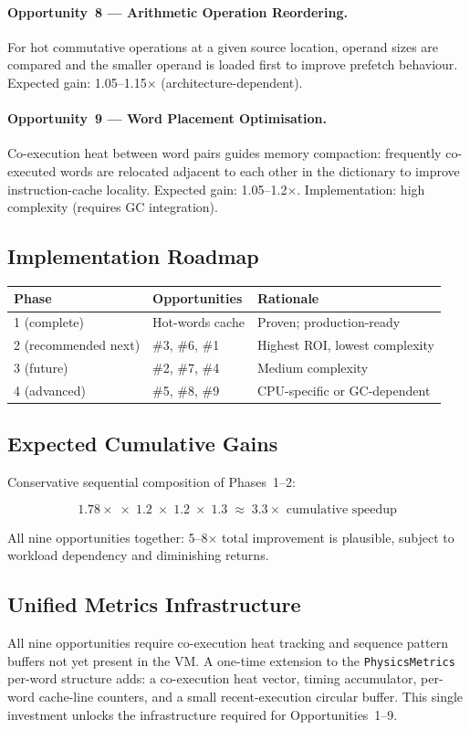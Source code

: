 \paragraph{Opportunity~8 — Arithmetic Operation Reordering.}
For hot commutative operations at a given source location, operand sizes
are compared and the smaller operand is loaded first to improve prefetch
behaviour. Expected gain: 1.05--1.15$\times$ (architecture-dependent).

\paragraph{Opportunity~9 — Word Placement Optimisation.}
Co-execution heat between word pairs guides memory compaction: frequently
co-executed words are relocated adjacent to each other in the dictionary
to improve instruction-cache locality. Expected gain: 1.05--1.2$\times$.
Implementation: high complexity (requires GC integration).

\subsection{Implementation Roadmap}

\begin{center}
\begin{tabular}{lll}
\toprule
Phase & Opportunities & Rationale \\
\midrule
1 (complete) & Hot-words cache & Proven; production-ready \\
2 (recommended next) & \#3, \#6, \#1 & Highest ROI, lowest complexity \\
3 (future) & \#2, \#7, \#4 & Medium complexity \\
4 (advanced) & \#5, \#8, \#9 & CPU-specific or GC-dependent \\
\bottomrule
\end{tabular}
\end{center}

\subsection{Expected Cumulative Gains}

Conservative sequential composition of Phases~1--2:

\[
  1.78\times \;\times\; 1.2\;\times\; 1.2\;\times\; 1.3
  \;\approx\; 3.3\times \text{ cumulative speedup}
\]

All nine opportunities together: 5--8$\times$ total improvement is
plausible, subject to workload dependency and diminishing returns.

\subsection{Unified Metrics Infrastructure}

All nine opportunities require co-execution heat tracking and sequence
pattern buffers not yet present in the VM. A one-time extension to the
\texttt{PhysicsMetrics} per-word structure adds: a co-execution heat
vector, timing accumulator, per-word cache-line counters, and a small
recent-execution circular buffer. This single investment unlocks the
infrastructure required for Opportunities~1--9.

